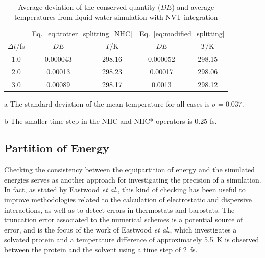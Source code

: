 \documentclass[aip,jcp,reprint,amsmath,amssymb]{revtex4-1}
\begin{document}
\begin{table}
	\begin{threeparttable}
		\caption{Average deviation of the conserved quantity ($DE$) and average temperatures from liquid water simulation with NVT integration }
		\label{table:denvt}
		\begin{ruledtabular}
			\begin{tabular}{ccccc}
				& \multicolumn{2}{c}{Eq.~\ref{eq:trotter_splitting_NHC}} & \multicolumn{2}{c}{Eq.~\ref{eq:modified_splitting}} \\
				\cline{2-5}
				$\Delta t$/fs & $D\!E$ & $T$/K & $D\!E$ & $T$/K \\
				\hline
				1.0 & 0.000043 & 298.16  & 0.000052  & 298.15 \\
				2.0 & 0.00013  & 298.23  & 0.00017   & 298.06 \\
				3.0 & 0.00089  & 298.17  & 0.0013    & 298.12
			\end{tabular}
		\end{ruledtabular}
		\begin{tablenotes}
			\item[a] The standard deviation of the mean temperature for all cases is $\sigma = 0.037$.
			\item[b] The smaller time step in the NHC and NHC* operators is 0.25 fs.
		\end{tablenotes}
	\end{threeparttable}
\end{table}

\subsection{Partition of Energy}
\label{sec:energypartition}

Checking the consistency between the equipartition of energy and the simulated energies serves as another approach for investigating the precision of a simulation. In fact, as stated by Eastwood \textit{et al}.,\cite{Eastwood_2010} this kind of checking has been useful to improve methodologies related to the calculation of  electrostatic\cite{Levitt_1988, Guenot_1992, Arnold_1994} and dispersive\cite{Sagui_1999} interactions, as well as to detect errors in thermostats\cite{Harvey_1998, Mor_2008} and barostats.\cite{Feller_1995} The truncation error associated to the numerical schemes is a potential source of error, and is the focus of the work of Eastwood \textit{et al}.,\cite{Eastwood_2010} which investigates a solvated protein and a temperature difference of approximately 5.5~K is observed between the protein and the solvent using a time step of 2~fs.
\end{document}
